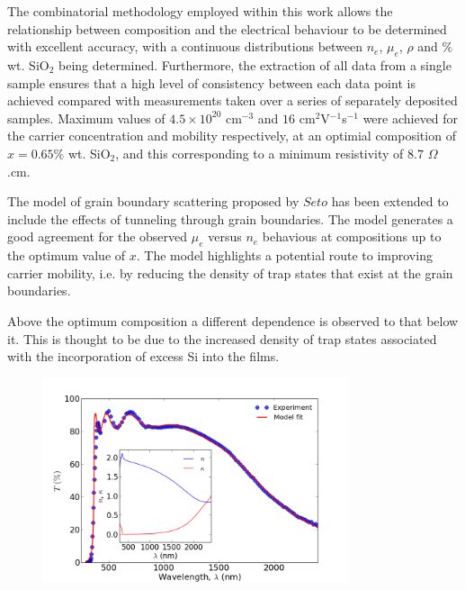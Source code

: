 \documentclass[aps,prl,preprint,showpacs,showkeys,linenumbers]{revtex4-1}
\begin{document}
The combinatorial methodology employed within this work allows the relationship between composition and the electrical behaviour to be determined with excellent accuracy, with a continuous distributions between $n_e$, $\mu_e$, $\rho$ and $\%$ wt. SiO$_{2}$ being determined. Furthermore, the extraction of all data from a single sample ensures that a high level of consistency between each data point is achieved compared with measurements taken over a series of separately deposited samples. Maximum values of $4.5\times10^{20}$ cm$^{-3}$ and $16$ cm$^{2}$V$^{-1}$s$^{-1}$ were achieved for the carrier concentration and mobility respectively, at an optimial composition of $x =0.65\%$ wt. SiO$_2$, and this corresponding to a minimum resistivity of $8.7$ $\Omega$.cm.

The model of grain boundary scattering proposed by $Seto$ \cite{Seto1975} has been extended to include the effects of tunneling through grain boundaries. The model generates a good agreement for the observed $\mu_e$ versus $n_e$ behavious at compositions up to the optimum value of $x$. The model highlights a potential route to improving carrier mobility, i.e. by reducing the density of trap states that exist at the grain boundaries.

Above the optimum composition a different dependence is observed to that below it. This is thought to be due to the increased density of trap states associated with the incorporation of excess Si into the films.
\begin{acknowledgements}

\end{acknowledgements}




\begin{figure}[0]
\centering
\includegraphics[width = 0.8\textwidth]{figure1.png}
\caption{\label{fig:1}}
\end{figure}
\end{document}
